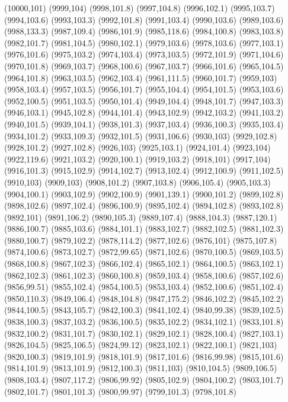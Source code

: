 (10000,101)
(9999,104)
(9998,101.8)
(9997,104.8)
(9996,102.1)
(9995,103.7)
(9994,103.6)
(9993,103.3)
(9992,101.8)
(9991,103.4)
(9990,103.6)
(9989,103.6)
(9988,133.3)
(9987,109.4)
(9986,101.9)
(9985,118.6)
(9984,100.8)
(9983,103.8)
(9982,101.7)
(9981,104.5)
(9980,102.1)
(9979,103.6)
(9978,103.6)
(9977,103.1)
(9976,101.6)
(9975,103.2)
(9974,103.4)
(9973,103.5)
(9972,101.9)
(9971,104.6)
(9970,101.8)
(9969,103.7)
(9968,100.6)
(9967,103.7)
(9966,101.6)
(9965,104.5)
(9964,101.8)
(9963,103.5)
(9962,103.4)
(9961,111.5)
(9960,101.7)
(9959,103)
(9958,103.4)
(9957,103.5)
(9956,101.7)
(9955,104.4)
(9954,101.5)
(9953,103.6)
(9952,100.5)
(9951,103.5)
(9950,101.4)
(9949,104.4)
(9948,101.7)
(9947,103.3)
(9946,103.1)
(9945,102.8)
(9944,101.4)
(9943,102.9)
(9942,103.2)
(9941,103.2)
(9940,101.5)
(9939,104.1)
(9938,101.3)
(9937,103.4)
(9936,100.3)
(9935,103.4)
(9934,101.2)
(9933,109.3)
(9932,101.5)
(9931,106.6)
(9930,103)
(9929,102.8)
(9928,101.2)
(9927,102.8)
(9926,103)
(9925,103.1)
(9924,101.4)
(9923,104)
(9922,119.6)
(9921,103.2)
(9920,100.1)
(9919,103.2)
(9918,101)
(9917,104)
(9916,101.3)
(9915,102.9)
(9914,102.7)
(9913,102.4)
(9912,100.9)
(9911,102.5)
(9910,103)
(9909,103)
(9908,101.2)
(9907,103.8)
(9906,105.4)
(9905,103.3)
(9904,100.1)
(9903,102.9)
(9902,100.9)
(9901,139.1)
(9900,101.2)
(9899,102.8)
(9898,102.6)
(9897,102.4)
(9896,100.9)
(9895,102.4)
(9894,102.8)
(9893,102.8)
(9892,101)
(9891,106.2)
(9890,105.3)
(9889,107.4)
(9888,104.3)
(9887,120.1)
(9886,100.7)
(9885,103.6)
(9884,101.1)
(9883,102.7)
(9882,102.5)
(9881,102.3)
(9880,100.7)
(9879,102.2)
(9878,114.2)
(9877,102.6)
(9876,101)
(9875,107.8)
(9874,100.6)
(9873,102.7)
(9872,99.65)
(9871,102.6)
(9870,100.5)
(9869,103.5)
(9868,100.8)
(9867,102.3)
(9866,102.4)
(9865,102.1)
(9864,100.5)
(9863,102.1)
(9862,102.3)
(9861,102.3)
(9860,100.8)
(9859,103.4)
(9858,100.6)
(9857,102.6)
(9856,99.51)
(9855,102.4)
(9854,100.5)
(9853,103.4)
(9852,100.6)
(9851,102.4)
(9850,110.3)
(9849,106.4)
(9848,104.8)
(9847,175.2)
(9846,102.2)
(9845,102.2)
(9844,100.5)
(9843,105.7)
(9842,100.3)
(9841,102.4)
(9840,99.38)
(9839,102.5)
(9838,100.3)
(9837,103.2)
(9836,100.5)
(9835,102.2)
(9834,102.1)
(9833,101.8)
(9832,100.2)
(9831,101.7)
(9830,102.1)
(9829,102.1)
(9828,100.4)
(9827,103.1)
(9826,104.5)
(9825,106.5)
(9824,99.12)
(9823,102.1)
(9822,100.1)
(9821,103)
(9820,100.3)
(9819,101.9)
(9818,101.9)
(9817,101.6)
(9816,99.98)
(9815,101.6)
(9814,101.9)
(9813,101.9)
(9812,100.3)
(9811,103)
(9810,104.5)
(9809,106.5)
(9808,103.4)
(9807,117.2)
(9806,99.92)
(9805,102.9)
(9804,100.2)
(9803,101.7)
(9802,101.7)
(9801,101.3)
(9800,99.97)
(9799,101.3)
(9798,101.8)
